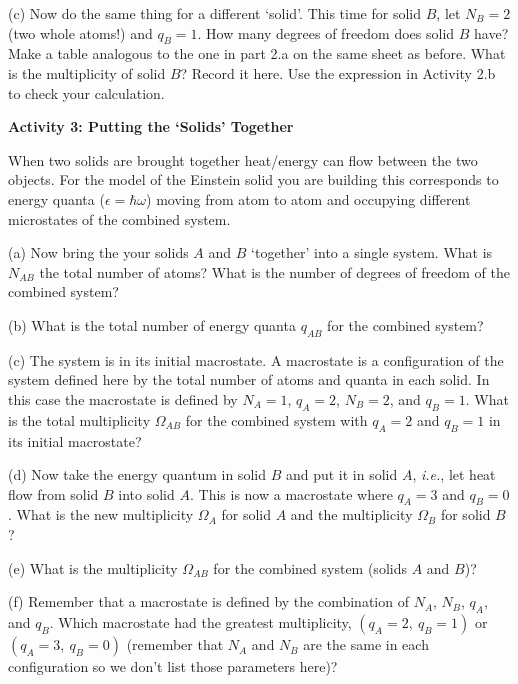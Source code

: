 (c) Now do the same thing for a different `solid'.
This time for solid $B$, let $N_B = 2$ (two whole atoms!) and $q_B = 1$.
How many degrees of freedom does solid $B$ have?
Make a table analogous to the one in part 2.a on the same sheet as before.
What is the multiplicity of solid $B$?
Record it here.
Use the expression in Activity 2.b to check your calculation.
\answerspace{45mm}

\textbf{Activity 3: Putting the `Solids' Together}

When two solids are brought together heat/energy can flow between the two objects.
For the model of the Einstein solid you are building this corresponds to 
energy quanta ($\epsilon=\hbar \omega$) moving from atom to atom and occupying different
microstates of the combined system.

(a) Now bring the your solids $A$ and $B$ `together' into a single system.
What is $N_{AB}$ the total number of atoms?
What is the number of degrees of freedom of the combined system?
\answerspace{25mm}

(b) What is the total number of energy quanta $q_{AB}$ for the combined system?
\vspace{10mm}

(c) The system is in its initial macrostate.
A macrostate is a configuration of the system defined here by the total number
of atoms and quanta in each solid.
In this case the macrostate is defined by $N_A=1$, $q_A=2$, $N_B=2$, and $q_B= 1$.
 What is the total multiplicity $\Omega_{AB}$ for the combined system
with $q_A=2$ and $q_B=1$ in its initial macrostate?
\vspace{15mm}

(d) Now take the energy quantum in solid $B$ and put it in solid $A$,
{\it i.e.}, let heat flow from solid $B$ into solid $A$.
This is now a macrostate where $q_A=3$ and $q_B=0$.
What is the new multiplicity $\Omega_A$ for solid $A$ and the  multiplicity $\Omega_B$ for solid $B$?
\vspace{20mm}

(e) What is the multiplicity $\Omega_{AB}$ for the combined system (solids $A$ and $B$)?
\vspace{15mm}

(f) Remember that a macrostate is defined by the combination of $N_A$, $N_B$, $q_A$, and $q_B$.
Which macrostate had the greatest multiplicity, $(q_A=2, ~ q_B=1)$ or $(q_A=3, ~ q_B=0)$
(remember that $N_A$ and $N_B$ are the same in each configuration so we don't 
list those parameters here)?
\vspace{15mm}

